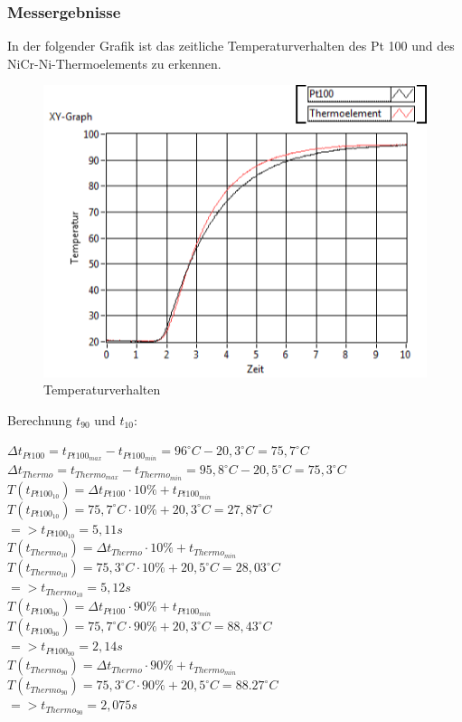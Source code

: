 \documentclass[a4paper,11pt,oneside]{article}
\begin{document}
\subsubsection{Messergebnisse}
In der folgender Grafik ist das zeitliche Temperaturverhalten des Pt 100 und des NiCr-Ni-Thermoelements zu erkennen.
\begin{center}
\begin{figure}[hbtp]
\centering
\includegraphics[scale=1]{Bilder/temperaturverhalten.png}
\caption{Temperaturverhalten}
\end{figure}
\end{center}
Berechnung $t_{90}$ und $t_{10}$:\\
\begin{center}
$\Delta t_{Pt100} = t_{Pt100_{max}} - t_{Pt100_{min}} = 96^\circ C - 20,3^\circ C = 75,7^\circ C$\\
$\Delta t_{Thermo} = t_{Thermo_{max}} - t_{Thermo_{min}} = 95,8^\circ C - 20,5^\circ C = 75,3^\circ C$\\
\vspace{0.5cm}
$T(t_{Pt100_{10}}) = \Delta t_{Pt100} \cdot 10\% + t_{Pt100_{min}}$\\
$T(t_{Pt100_{10}}) = 75,7^\circ C \cdot 10\% + 20,3^\circ C = 27,87^\circ C$\\
$=> t_{Pt100_{10}} = 5,11s$\\
\vspace{0.5cm}
$T(t_{Thermo_{10}}) = \Delta t_{Thermo} \cdot 10\% + t_{Thermo_{min}}$\\
$T(t_{Thermo_{10}}) = 75,3^\circ C \cdot 10\% + 20,5^\circ C = 28,03^\circ C$\\
$=> t_{Thermo_{10}} = 5,12s$\\
\vspace{0.5cm}
$T(t_{Pt100_{90}}) = \Delta t_{Pt100} \cdot 90\% + t_{Pt100_{min}}$\\
$T(t_{Pt100_{90}}) = 75,7^\circ C \cdot 90\% + 20,3^\circ C = 88,43^\circ C$\\
$=> t_{Pt100_{90}} = 2,14s$\\
\vspace{0.5cm}
$T(t_{Thermo_{90}}) = \Delta t_{Thermo} \cdot 90\% + t_{Thermo_{min}}$\\
$T(t_{Thermo_{90}}) = 75,3^\circ C \cdot 90\% + 20,5^\circ C = 88.27^\circ C$\\
$=> t_{Thermo_{90}} = 2,075s$\\
\end{center}
\end{document}
